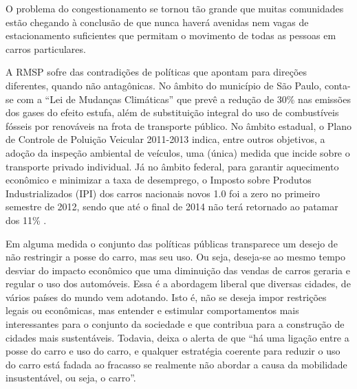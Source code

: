 \begin{citacao}
O problema do congestionamento se tornou tão grande que muitas comunidades estão chegando à conclusão de que nunca haverá avenidas nem vagas de estacionamento suficientes que permitam o movimento de todas as pessoas em carros particulares.
\end{citacao}

A RMSP sofre das contradições de políticas que apontam para direções diferentes, quando não antagônicas. No âmbito do município de São Paulo, conta-se com a ``Lei de Mudanças Climáticas'' \cite{LEICLIMASP2009} que prevê a redução de 30\% nas emissões dos gases do efeito estufa, além de substituição integral do uso de combustíveis fósseis por renováveis na frota de transporte público. No âmbito estadual, o Plano de Controle de Poluição Veicular 2011-2013 \cite{PCPV2011} indica, entre outros objetivos, a adoção da inspeção ambiental de veículos, uma (única) medida que incide sobre o transporte privado individual. Já no âmbito federal, para garantir aquecimento econômico e minimizar a taxa de desemprego, o Imposto sobre Produtos Industrializados (IPI) dos carros nacionais novos 1.0 foi a zero no primeiro semestre de 2012, sendo que até o final de 2014 não terá retornado ao patamar dos 11\% \cite{FAZENDA2014}.

Em alguma medida o conjunto das políticas públicas transparece um desejo de não restringir a posse do carro, mas seu uso. Ou seja, deseja-se ao mesmo tempo desviar do impacto econômico que uma diminuição das vendas de carros geraria e regular o uso dos automóveis. Essa é a abordagem liberal que diversas cidades, de vários países do mundo vem adotando. Isto é, não se deseja impor restrições legais ou econômicas, mas entender e estimular comportamentos mais interessantes para o conjunto da sociedade e que contribua para a construção de cidades mais sustentáveis. Todavia,  deixa o alerta de que ``há uma ligação entre a posse do carro e uso do carro, e qualquer estratégia coerente para reduzir o uso do carro está fadada ao fracasso se realmente não abordar a causa da mobilidade insustentável, ou seja, o carro''.
